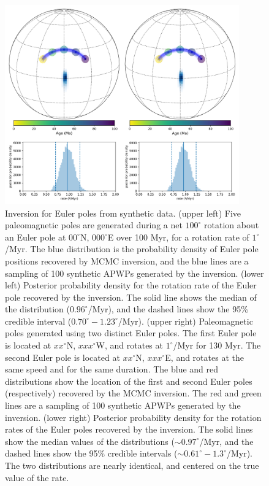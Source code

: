 \documentclass[11pt,letterpaper]{article}
\begin{document}
\begin{figure}
\includegraphics[width=0.9\textwidth]{fig_synthetic_pep.png}
\caption{Inversion for Euler poles from synthetic data. (upper left) Five paleomagnetic poles are generated during a net $100^\circ$ rotation about an Euler pole at $00^\circ$N, $000^\circ$E over 100 Myr, for a rotation rate of $1^\circ$/Myr. The blue distribution is the probability density of Euler pole positions recovered by MCMC inversion, and the blue lines are a sampling of 100 synthetic APWPs generated by the inversion. (lower left) Posterior probability density for the rotation rate of the Euler pole recovered by the inversion. The solid line shows the median of the distribution ($0.96^\circ$/Myr), and the dashed lines show the 95\% credible interval ($0.70^\circ-1.23^\circ$/Myr). (upper right) Paleomagnetic poles generated using two distinct Euler poles. The first Euler pole is located at $xx^\circ$N, $xxx^\circ$W, and rotates at $1^\circ$/Myr for 130 Myr. The second Euler pole is located at $xx^\circ$N, $xxx^\circ$E, and rotates at the same speed and for the same duration. The blue and red distributions show the location of the first and second Euler poles (respectively) recovered by the MCMC inversion. The red and green lines are a sampling of 100 synthetic APWPs generated by the inversion. (lower right) Posterior probability density for the rotation rates of the Euler poles recovered by the inversion. The solid lines show the median values of the distributions ($\sim 0.97^\circ$/Myr, and the dashed lines show the 95\% credible intervals ($\sim 0.61^\circ-1.3^\circ$/Myr). The two distributions are nearly identical, and centered on the true value of the rate.}
\label{fig:synthetic_pep}
\end{figure}
\end{document}
